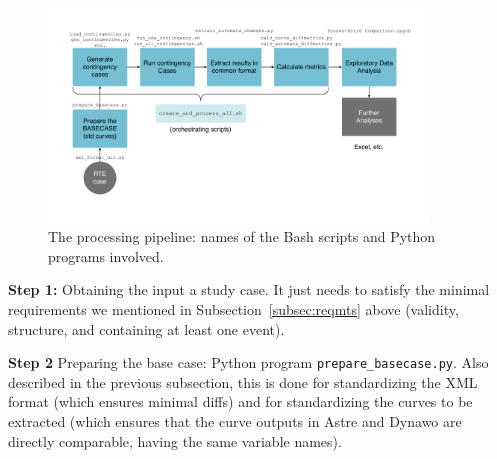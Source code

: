 \documentclass[11pt, a4paper, twoside, titlepage]{article}
\newcommand{\code}[1]{\texttt{#1}}
\begin{document}
\begin{figure}
  \centering
  \includegraphics[width=0.9\textwidth]{figs/pipeline2}
  \caption{The processing pipeline: names of the Bash scripts and
    Python programs involved.}
  \label{fig:pipeline2}
\end{figure}

\noindent\textbf{Step 1:} Obtaining the input a study case. It just
needs to satisfy the minimal requirements we mentioned in
Subsection~\ref{subsec:reqmts} above (validity, structure, and
containing at least one event).

\noindent\textbf{Step 2} Preparing the base case: Python program
\code{prepare\_basecase.py}.  Also described in the previous
subsection, this is done for standardizing the XML format (which
ensures minimal diffs) and for standardizing the curves to be
extracted (which ensures that the curve outputs in Astre and Dynawo
are directly comparable, having the same variable names).
\end{document}
